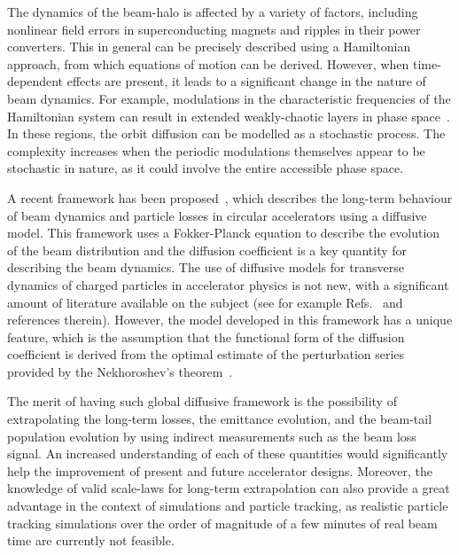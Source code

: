 The dynamics of the beam-halo is affected by a variety of factors, including nonlinear field errors in superconducting magnets and ripples in their power converters. This in general can be precisely described using a Hamiltonian approach, from which equations of motion can be derived. However, when time-dependent effects are present, it leads to a significant change in the nature of beam dynamics. For example, modulations in the characteristic frequencies of the Hamiltonian system can result in extended weakly-chaotic layers in phase space~\cite{NEISHTADT1991}. In these regions, the orbit diffusion can be modelled as a stochastic process. The complexity increases when the periodic modulations themselves appear to be stochastic in nature, as it could involve the entire accessible phase space.

A recent framework has been proposed~\cite{Bazzani:2019lse,bazzani2020diffusion}, which describes the long-term behaviour of beam dynamics and particle losses in circular accelerators using a diffusive model. This framework uses a Fokker-Planck equation to describe the evolution of the beam distribution and the diffusion coefficient is a key quantity for describing the beam dynamics. The use of diffusive models for transverse dynamics of charged particles in accelerator physics is not new, with a significant amount of literature available on the subject (see for example Refs.~{\cite{Burnod:205343,Meddahi:223301,PhysRevLett.68.33,gerasimov1992applicability,MESS1994279,zimmermann1994transverse,PhysRevLett.77.1051,PhysRevSTAB.5.074001,flilleriii:pac03-rpag004,stancari2011diffusion,stancari:ipac11-tupz033,PhysRevSTAB.15.101001,Stancari:1637929}} and references therein). However, the model developed in this framework has a unique feature, which is the assumption that the functional form of the diffusion coefficient is derived from the optimal estimate of the perturbation series provided by the Nekhoroshev's theorem~\cite{Nekhoroshev:1977aa,Bazzani:1990aa,Turchetti:1990aa}.

The merit of having such global diffusive framework is the possibility of extrapolating the long-term losses, the emittance evolution, and the beam-tail population evolution by using indirect measurements such as the beam loss signal. An increased understanding of each of these quantities would significantly help the improvement of present and future accelerator designs. Moreover, the knowledge of valid scale-laws for long-term extrapolation can also provide a great advantage in the context of simulations and particle tracking, as realistic particle tracking simulations over the order of magnitude of a few minutes of real beam time are currently not feasible.

